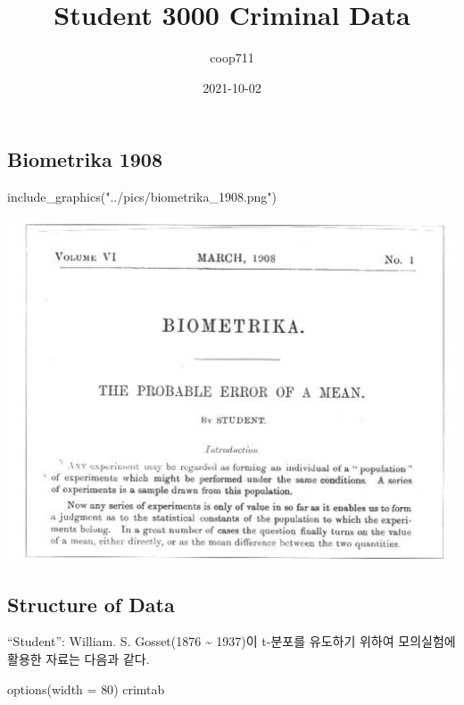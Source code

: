 \documentclass[
]{article}
\title{Student 3000 Criminal Data}
\author{coop711}
\date{2021-10-02}
\newenvironment{Shaded}{\begin{snugshade}}{\end{snugshade}}
\newcommand{\AttributeTok}[1]{\textcolor[rgb]{0.77,0.63,0.00}{#1}}
\newcommand{\DecValTok}[1]{\textcolor[rgb]{0.00,0.00,0.81}{#1}}
\newcommand{\FunctionTok}[1]{\textcolor[rgb]{0.00,0.00,0.00}{#1}}
\newcommand{\NormalTok}[1]{#1}
\newcommand{\StringTok}[1]{\textcolor[rgb]{0.31,0.60,0.02}{#1}}
\begin{document}
\maketitle

\hypertarget{biometrika-1908}{%
\subsection{Biometrika 1908}\label{biometrika-1908}}

\begin{Shaded}
\begin{Highlighting}[]
\FunctionTok{include\_graphics}\NormalTok{(}\StringTok{"../pics/biometrika\_1908.png"}\NormalTok{)}
\end{Highlighting}
\end{Shaded}

\includegraphics[width=0.67\linewidth]{../pics/biometrika_1908}

\hypertarget{structure-of-data}{%
\subsection{Structure of Data}\label{structure-of-data}}

``Student'': William. S. Gosset(1876 \textasciitilde{} 1937)이 t-분포를
유도하기 위하여 모의실험에 활용한 자료는 다음과 같다.

\begin{Shaded}
\begin{Highlighting}[]
\FunctionTok{options}\NormalTok{(}\AttributeTok{width =} \DecValTok{80}\NormalTok{)}
\NormalTok{crimtab}
\end{Highlighting}
\end{Shaded}
\end{document}
